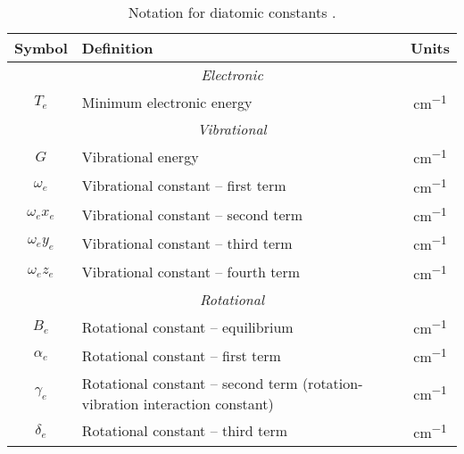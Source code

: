 \documentclass[11pt, twoside, fleqn]{report}
\begin{document}
\begin{table}[H]
    \centering
    \caption{Notation for diatomic constants \cite{herzbergMolecularSpectraMolecular1950,nistDiatomicSpectralDatabase2018a,nistDiatomicSpectralDatabase2018}.}
    \label{t:notation}
    \begin{tabular}{clc}
        \toprule
        Symbol            & Definition                                                                   & Units            \\
        \midrule
        \multicolumn{3}{c}{\textit{Electronic}}                                                                             \\
        \cmidrule(lr){1-3}
        $T_e$           & Minimum electronic energy                                                    & \unit{cm^{-1}}   \\
        \multicolumn{3}{c}{\textit{Vibrational}}                                                                            \\
        \cmidrule(lr){1-3}
        $G$               & Vibrational energy                                                           & \unit{cm^{-1}}   \\
        $\omega_e$      & Vibrational constant -- first term                                           & \unit{cm^{-1}}   \\
        $\omega_ex_e$ & Vibrational constant -- second term                                          & \unit{cm^{-1}}   \\
        $\omega_ey_e$ & Vibrational constant -- third term                                           & \unit{cm^{-1}}   \\
        $\omega_ez_e$ & Vibrational constant -- fourth term                                          & \unit{cm^{-1}}   \\
        \multicolumn{3}{c}{\textit{Rotational}}                                                                             \\
        \cmidrule(lr){1-3}
        $B_e$           & Rotational constant -- equilibrium                                           & \unit{cm^{-1}}   \\
        $\alpha_e$      & Rotational constant -- first term                                            & \unit{cm^{-1}}   \\
        $\gamma_e$      & Rotational constant -- second term (rotation-vibration interaction constant) & \unit{cm^{-1}}   \\
        $\delta_e$      & Rotational constant -- third term                                            & \unit{cm^{-1}}   \\

\end{tabular}
\end{table}
\end{document}
